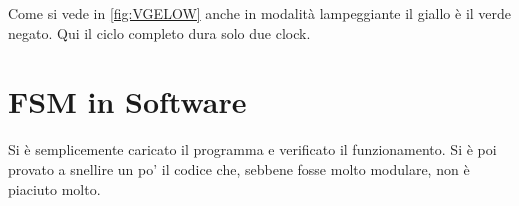 \documentclass[a4paper,10pt]{article}
\begin{document}
Come si vede in \cref{fig:VGELOW} anche in modalità lampeggiante il giallo è il verde negato. Qui il ciclo completo dura solo due clock.


\section{FSM in Software}

Si è semplicemente caricato il programma e verificato il funzionamento. Si è poi provato a snellire un po' il codice che, sebbene fosse molto modulare, non è piaciuto molto. 




\end{document}
